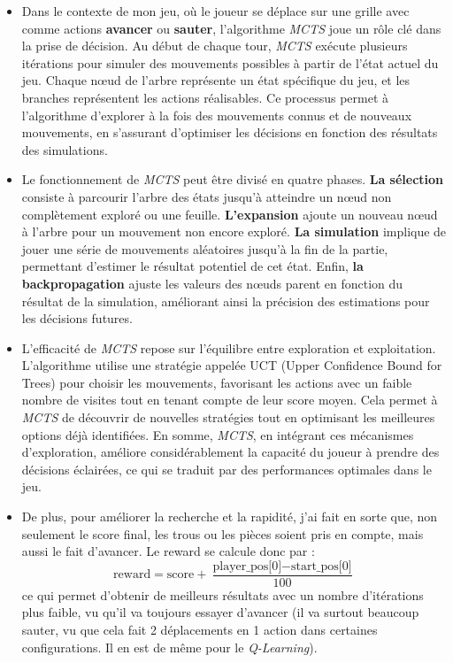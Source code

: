 \documentclass[a4paper,12pt]{article}
\begin{document}
            \begin{itemize}
                \item Dans le contexte de mon jeu, où le joueur se déplace sur une grille avec comme actions \textbf{avancer} ou \textbf{sauter}, l'algorithme \textit{MCTS} joue un rôle clé dans la prise de décision. Au début de chaque tour, \textit{MCTS} exécute plusieurs itérations pour simuler des mouvements possibles à partir de l'état actuel du jeu. Chaque nœud de l'arbre représente un état spécifique du jeu, et les branches représentent les actions réalisables. Ce processus permet à l'algorithme d'explorer à la fois des mouvements connus et de nouveaux mouvements, en s'assurant d'optimiser les décisions en fonction des résultats des simulations.

                \item Le fonctionnement de \textit{MCTS} peut être divisé en quatre phases. \textbf{La sélection} consiste à parcourir l'arbre des états jusqu'à atteindre un nœud non complètement exploré ou une feuille. \textbf{L'expansion} ajoute un nouveau nœud à l'arbre pour un mouvement non encore exploré. \textbf{La simulation} implique de jouer une série de mouvements aléatoires jusqu'à la fin de la partie, permettant d'estimer le résultat potentiel de cet état. Enfin, \textbf{la backpropagation} ajuste les valeurs des nœuds parent en fonction du résultat de la simulation, améliorant ainsi la précision des estimations pour les décisions futures.
                
                \item L'efficacité de \textit{MCTS} repose sur l'équilibre entre exploration et exploitation. L'algorithme utilise une stratégie appelée UCT (Upper Confidence Bound for Trees) pour choisir les mouvements, favorisant les actions avec un faible nombre de visites tout en tenant compte de leur score moyen. Cela permet à \textit{MCTS} de découvrir de nouvelles stratégies tout en optimisant les meilleures options déjà identifiées. En somme, \textit{MCTS}, en intégrant ces mécanismes d'exploration, améliore considérablement la capacité du joueur à prendre des décisions éclairées, ce qui se traduit par des performances optimales dans le jeu.

                \item De plus, pour améliorer la recherche et la rapidité, j'ai fait en sorte que, non seulement le score final, les trous ou les pièces soient pris en compte, mais aussi le fait d'avancer. Le reward se calcule donc par :
                \[
                \text{reward} = \text{score} + \frac{\text{player\_pos[0]} - \text{start\_pos[0]}}{100}
                \]
                ce qui permet d'obtenir de meilleurs résultats avec un nombre d'itérations plus faible, vu qu'il va toujours essayer d'avancer (il va surtout beaucoup sauter, vu que cela fait 2 déplacements en 1 action dans certaines configurations. Il en est de même pour le \textit{Q-Learning}).
            \end{itemize}
    
\end{document}
